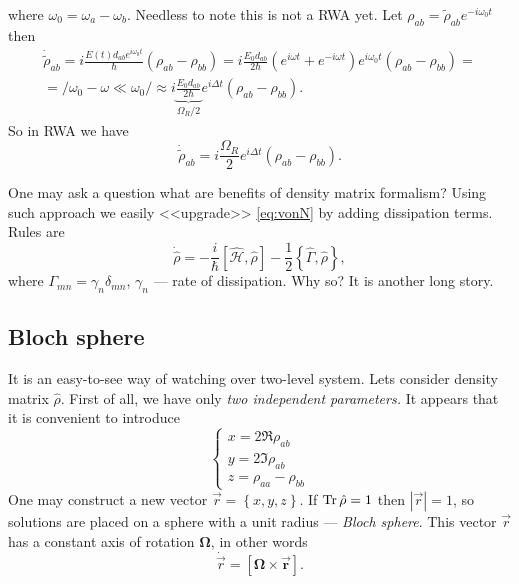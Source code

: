 where $\omega_0 = \omega_a - \omega_b$. Needless to note this is not a RWA yet. Let $\rho_{ab} = \widetilde{\rho}_{ab} e^{-i \omega_0 t}$ then
\begin{multline}
	\dot{\widetilde{\rho}}_{ab} = i \frac{E(t) d_{ab} e^{i \omega_0 t}}{\hbar} \left( \rho_{ab} - \rho_{bb} \right) = i \frac{E_0 d_{ab}}{2 \hbar} \left( e^{i \omega t} + e^{- i \omega t} \right) e^{i \omega_0 t} \left( \rho_{ab} - \rho_{bb} \right) = \\ = \Big/ \omega_0 - \omega \ll \omega_0 \Big/ \approx 
	i \underbrace{\frac{E_0 d_{ab}}{2 \hbar}}_{\Omega_R/2} e^{i \Delta t}\left( \rho_{ab} - \rho_{bb} \right).
\end{multline}
So in RWA we have
\begin{equation}
	\dot{\widetilde{\rho}}_{ab} = i \frac{\Omega_R}{2} e^{i \Delta t} \left( \rho_{ab} - \rho_{bb} \right).
\end{equation}

One may ask a question what are benefits of density matrix formalism? Using such approach we easily <<upgrade>> \eqref{eq:vonN} by adding dissipation terms. Rules are
\begin{equation}
	\dot{\hat{\rho}} = - \frac{i}{\hbar} \left[ \hat{\mathscr{H}}, \hat{\rho} \right] - \frac{1}{2} \left\{ \hat{\Gamma}, \hat{\rho} \right\},
\end{equation}
where $\Gamma_{mn} = \gamma_{n} \delta_{mn}$, $\gamma_n$ --- rate of dissipation. Why so? It is another long story.

\subsection{Bloch sphere}

It is an easy-to-see way of watching over two-level system. Lets consider density matrix $\hat{\rho}$. First of all, we have only \textit{two independent parameters.} It appears that it is convenient to introduce
\begin{equation}
	\begin{cases}
		x = 2 \Re \rho_{ab} \\
		y = 2 \Im \rho_{ab} \\
		z = \rho_{aa} - \rho_{bb}
	\end{cases}
	\label{eq:tmp_system}
\end{equation} 
One may construct a new vector $\vec{r} = \left\{ x,y,z \right\}$. If $\operatorname{Tr} \hat{\rho} = 1$ then $\left|\vec{r}\right| = 1$, so solutions are placed on a sphere with a unit radius --- \textit{Bloch sphere}.
This vector $\vec{r}$ has a constant axis of rotation $\bm{\Omega}$, in other words
\begin{equation}
	\dot{\vec{r}} = \left[ \bm{\Omega \times \vec{r}} \right].
\end{equation}

